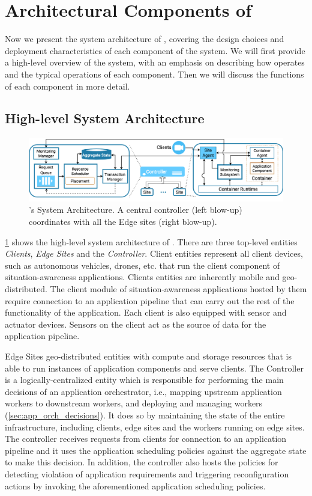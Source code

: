 \section{Architectural Components of \oneedge{}}
Now we present the system architecture of \oneedge{}, covering the design choices and deployment characteristics of each component of the system. We will first provide a high-level overview of the system, with an emphasis on describing how \oneedge{} operates and the typical operations of each component. Then we will discuss the functions of each component in more detail.

\subsection{High-level System Architecture}
\begin{figure}[t]
\centering
\includegraphics[width=0.85\columnwidth]{figures/oneedge/onefog_overview.png}
\caption{\oneedge{}'s System Architecture. A central controller (left blow-up) coordinates with all the Edge sites (right blow-up).}
\label{fig:system_arch}
\vspace{-2mm}
\end{figure}
\cref{fig:system_arch} shows the high-level system architecture of \oneedge{}. There are three top-level entities \textit{Clients}, \textit{Edge Sites} and the \textit{Controller}. 
Client entities represent all client devices, such as autonomous vehicles, drones, etc. that run the client component of situation-awareness applications. Clients entities are inherently mobile and geo-distributed. The client module of situation-awareness applications hosted by them require connection to an application pipeline that can carry out the rest of the functionality of the application. Each client is also equipped with sensor and actuator devices. Sensors on the client act as the source of data for the application pipeline. 
\par Edge Sites geo-distributed entities with compute and storage resources that is able to run instances of application components and serve clients. The Controller is a logically-centralized entity which is responsible for performing the main decisions of an application orchestrator, i.e., mapping upstream application workers to downstream workers, and deploying and managing workers (\cref{sec:app_orch_decisions}). It does so by maintaining the state of the entire infrastructure, including clients, edge sites and the workers running on edge sites. The controller receives requests from clients for connection to an application pipeline and it uses the application scheduling policies against the aggregate state to make this decision. In addition, the controller also hosts the policies for detecting violation of application requirements and triggering reconfiguration actions by invoking the aforementioned application scheduling policies.

